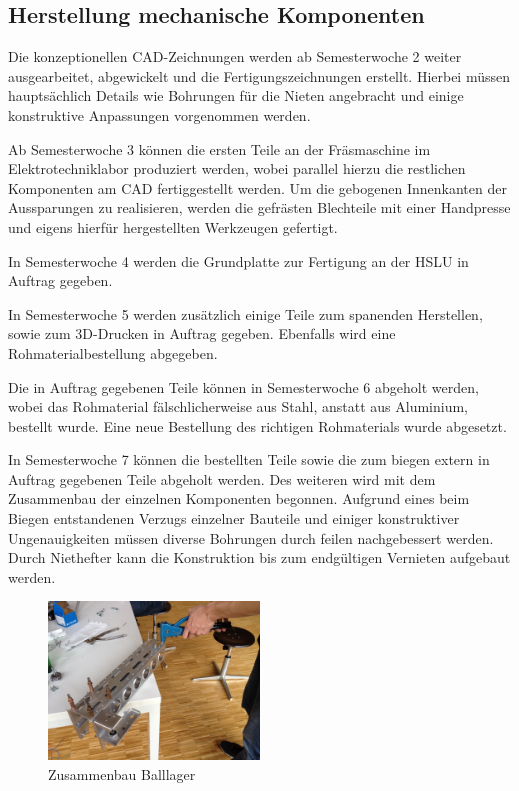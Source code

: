 \subsection{Herstellung mechanische Komponenten}
Die konzeptionellen CAD-Zeichnungen werden ab Semesterwoche 2 weiter 
ausgearbeitet, abgewickelt und die Fertigungszeichnungen erstellt. Hierbei 
müssen hauptsächlich Details wie Bohrungen für die Nieten angebracht und 
einige konstruktive Anpassungen vorgenommen werden. 

Ab Semesterwoche 3 können die ersten Teile an der Fräsmaschine im 
Elektrotechniklabor produziert werden, wobei parallel  hierzu die restlichen 
Komponenten am CAD fertiggestellt werden.  Um die gebogenen Innenkanten der 
Aussparungen zu realisieren, werden die gefrästen Blechteile mit einer 
Handpresse und eigens hierfür hergestellten Werkzeugen gefertigt.

In Semesterwoche 4 werden die Grundplatte zur Fertigung an der HSLU in Auftrag 
gegeben.

In Semesterwoche 5 werden zusätzlich einige Teile zum spanenden Herstellen, 
sowie zum 3D-Drucken in Auftrag gegeben. Ebenfalls wird eine 
Rohmaterialbestellung abgegeben.

Die in Auftrag gegebenen Teile können in Semesterwoche 6 abgeholt werden, 
wobei das  Rohmaterial fälschlicherweise aus Stahl, anstatt aus Aluminium, 
bestellt wurde. Eine neue Bestellung des richtigen Rohmaterials wurde abgesetzt.

In Semesterwoche 7 können die bestellten Teile sowie die zum biegen extern in 
Auftrag gegebenen Teile abgeholt werden. Des weiteren wird mit dem Zusammenbau 
der einzelnen Komponenten begonnen. Aufgrund eines beim Biegen entstandenen 
Verzugs einzelner Bauteile und einiger konstruktiver Ungenauigkeiten müssen 
diverse Bohrungen durch feilen nachgebessert werden. Durch Niethefter kann die 
Konstruktion bis zum endgültigen Vernieten aufgebaut werden.

\begin{figure}[h!]          
	\centering             
	\includegraphics[width=0.5\textwidth]{fig/IMG_2290.JPG}
	\caption{Zusammenbau Balllager}
	\label{fig:Zusammenbau Balllager}        
\end{figure}

